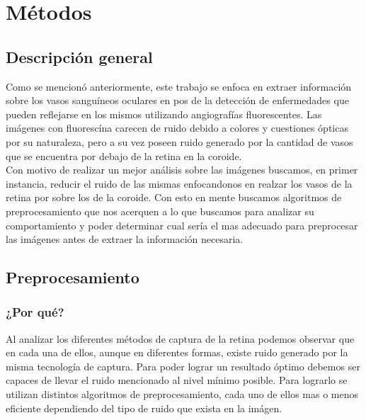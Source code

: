 
\chapter{M\'etodos} %

\label{Chapter3} %


\section{Descripci\'on general}

Como se mencion\'o anteriormente, este trabajo se enfoca en extraer informaci\'on sobre los vasos sangu\'ineos oculares en pos de la detecci\'on de enfermedades que pueden reflejarse en los mismos utilizando angiograf\'ias fluorescentes.
Las im\'agenes con fluoresc\'ina carecen de ruido debido a colores y cuestiones \'opticas por su naturaleza, pero a su vez poseen ruido generado por la cantidad de vasos que se encuentra por debajo de la retina en la coroide.\\
Con motivo de realizar un mejor an\'alisis sobre las im\'agenes buscamos, en primer instancia, reducir el ruido de las mismas enfocandonos en realzar los vasos de la retina por sobre los de la coroide. Con esto en mente buscamos algoritmos de preprocesamiento que nos acerquen a lo que buscamos para analizar su comportamiento y poder determinar cual ser\'ia el mas adecuado para preprocesar las im\'agenes antes de extraer la informaci\'on necesaria.

\section{Preprocesamiento}
\subsection{¿Por qu\'e?}
Al analizar los diferentes m\'etodos de captura de la retina podemos observar que en cada una de ellos, aunque en diferentes formas, existe ruido generado por la misma tecnolog\'ia de captura. Para poder lograr un resultado \'optimo debemos ser capaces de llevar el ruido mencionado al nivel m\'inimo posible. Para lograrlo se utilizan distintos algoritmos de preprocesamiento, cada uno de ellos mas o menos eficiente dependiendo del tipo de ruido que exista en la im\'agen.\\


